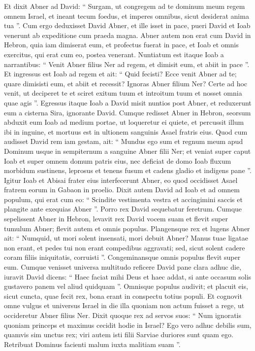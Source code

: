 \begin{biblechapter}
\begin{biblechapter}
\begin{biblechapter}
\verse Et dixit Abner ad David: “ Surgam, ut congregem ad te dominum meum regem omnem Israel, et ineant tecum foedus, et imperes omnibus, sicut desiderat anima tua ”.
 Cum ergo deduxisset David Abner, et ille isset in pace, 
\verse pueri David et Ioab venerunt ab expeditione cum praeda magna. Abner autem non erat cum David in Hebron, quia iam dimiserat eum, et profectus fuerat in pace, 
\verse et Ioab et omnis exercitus, qui erat cum eo, postea venerant. Nuntiatum est itaque Ioab a narrantibus: “ Venit Abner filius Ner ad regem, et dimisit eum, et abiit in pace ”. 
\verse Et ingressus est Ioab ad regem et ait: “ Quid fecisti? Ecce venit Abner ad te; quare dimisisti eum, et abiit et recessit? 
\verse Ignoras Abner filium Ner? Certe ad hoc venit, ut deciperet te et sciret exitum tuum et introitum tuum et nosset omnia quae agis ”.
 \verse Egressus itaque Ioab a David misit nuntios post Abner, et reduxerunt eum a cisterna Sira, ignorante David. 
\verse Cumque redisset Abner in Hebron, seorsum abduxit eum Ioab ad medium portae, ut loqueretur ei quiete, et percussit illum ibi in inguine, et mortuus est in ultionem sanguinis Asael fratris eius. 
\verse Quod cum audisset David rem iam gestam, ait: “ Mundus ego sum et regnum meum apud Dominum usque in sempiternum a sanguine Abner filii Ner; 
\verse et veniat super caput Ioab et super omnem domum patris eius, nec deficiat de domo Ioab fluxum morbidum sustinens, leprosus et tenens fusum et cadens gladio et indigens pane ”. 
\verse Igitur Ioab et Abisai frater eius interfecerunt Abner, eo quod occidisset Asael fratrem eorum in Gabaon in proelio.
 \verse Dixit autem David ad Ioab et ad omnem populum, qui erat cum eo: “ Scindite vestimenta vestra et accingimini saccis et plangite ante exequias Abner ”. Porro rex David sequebatur feretrum. 
\verse Cumque sepelissent Abner in Hebron, levavit rex David vocem suam et flevit super tumulum Abner; flevit autem et omnis populus. 
\verse Plangensque rex et lugens Abner ait:
 “ Numquid, ut mori solent insensati,
 mori debuit Abner?
 \verse Manus tuae ligatae non erant,
 et pedes tui non erant compedibus aggravati;
 sed, sicut solent cadere coram filiis iniquitatis, corruisti ”.
 Congeminansque omnis populus flevit super eum. 
\verse Cumque venisset universa multitudo reficere David pane clara adhuc die, iuravit David dicens: “ Haec faciat mihi Deus et haec addat, si ante occasum solis gustavero panem vel aliud quidquam ”. 
\verse Omnisque populus audivit; et placuit eis, sicut cuncta, quae fecit rex, bona erant in conspectu totius populi. 
\verse Et cognovit omne vulgus et universus Israel in die illa quoniam non actum fuisset a rege, ut occideretur Abner filius Ner. 
\verse Dixit quoque rex ad servos suos: “ Num ignoratis quoniam princeps et maximus cecidit hodie in Israel? 
\verse Ego vero adhuc debilis sum, quamvis sim unctus rex; viri autem isti filii Sarviae duriores sunt quam ego. Retribuat Dominus facienti malum iuxta malitiam suam ”.
 

\end{biblechapter}
\end{biblechapter}
\end{biblechapter}
